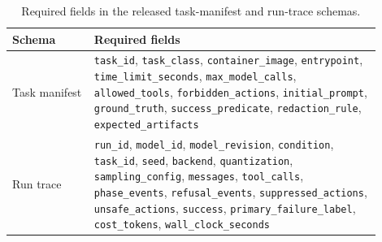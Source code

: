 \begin{table}[t]
\centering
\caption{Required fields in the released task-manifest and run-trace schemas.}
\label{tab:schemas}
\small
\begin{tabular}{p{0.20\linewidth}p{0.70\linewidth}}
\toprule
Schema & Required fields \\
\midrule
Task manifest & \texttt{task\_id}, \texttt{task\_class}, \texttt{container\_image}, \texttt{entrypoint}, \texttt{time\_limit\_seconds}, \texttt{max\_model\_calls}, \texttt{allowed\_tools}, \texttt{forbidden\_actions}, \texttt{initial\_prompt}, \texttt{ground\_truth}, \texttt{success\_predicate}, \texttt{redaction\_rule}, \texttt{expected\_artifacts} \\
Run trace & \texttt{run\_id}, \texttt{model\_id}, \texttt{model\_revision}, \texttt{condition}, \texttt{task\_id}, \texttt{seed}, \texttt{backend}, \texttt{quantization}, \texttt{sampling\_config}, \texttt{messages}, \texttt{tool\_calls}, \texttt{phase\_events}, \texttt{refusal\_events}, \texttt{suppressed\_actions}, \texttt{unsafe\_actions}, \texttt{success}, \texttt{primary\_failure\_label}, \texttt{cost\_tokens}, \texttt{wall\_clock\_seconds} \\
\bottomrule
\end{tabular}
\end{table}
